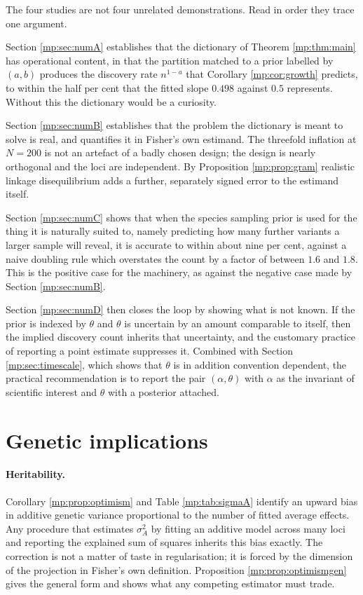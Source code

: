 The four studies are not four unrelated demonstrations. Read in order they trace one
argument.

Section \ref{mp:sec:numA} establishes that the dictionary of Theorem \ref{mp:thm:main} has
operational content, in that the partition matched to a prior labelled by $(a,b)$ produces the discovery rate
$n^{1-a}$ that Corollary \ref{mp:cor:growth} predicts, to within the half per cent that the
fitted slope $0.498$ against $0.5$ represents. Without this the dictionary would be a
curiosity.

Section \ref{mp:sec:numB} establishes that the problem the dictionary is meant to solve is
real, and quantifies it in Fisher's own estimand. The threefold inflation at $N=200$ is not
an artefact of a badly chosen design; the design is nearly orthogonal and the loci are
independent.
By Proposition \ref{mp:prop:gram} realistic linkage disequilibrium adds a further, separately
signed error to the estimand itself.

Section \ref{mp:sec:numC} shows that when the species sampling prior is used for the thing it
is naturally suited to, namely predicting how many further variants a larger sample will
reveal, it is accurate to within about nine per cent, against a naive doubling rule which overstates
the count by a factor of between $1.6$ and $1.8$. This is the positive case for the
machinery, as against the negative case made by Section \ref{mp:sec:numB}.

Section \ref{mp:sec:numD} then closes the loop by showing what is not known. If the prior is
indexed by $\theta$ and $\theta$ is uncertain by an amount comparable to itself, then the
implied discovery count inherits that uncertainty, and the customary practice of reporting a
point estimate suppresses it. Combined with Section \ref{mp:sec:timescale}, which shows that
$\theta$ is in addition convention dependent, the practical recommendation is to report the
pair $(\alpha,\theta)$ with $\alpha$ as the invariant of scientific interest and $\theta$
with a posterior attached.

\section{Genetic implications}
\label{mp:sec:genetics}

\paragraph{Heritability.} Corollary \ref{mp:prop:optimism} and Table \ref{mp:tab:sigmaA} identify
an upward bias in additive genetic variance proportional to the number of fitted average
effects. Any procedure that estimates $\sigma_A^2$ by fitting an additive model across many
loci and reporting the explained sum of squares inherits this bias exactly. The correction is
not a matter of taste in regularisation; it is forced by the dimension of the projection in
Fisher's own definition. Proposition \ref{mp:prop:optimismgen} gives the general form and shows
what any competing estimator must trade.

